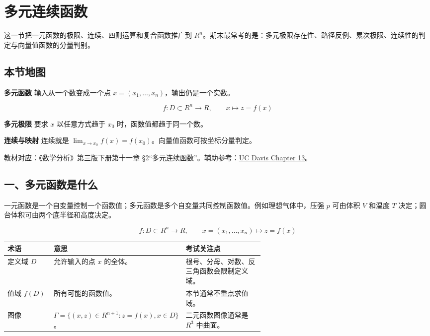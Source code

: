 \section{多元连续函数}

这一节把一元函数的极限、连续、四则运算和复合函数推广到 \(R^n\)。期末最常考的是：多元极限存在性、路径反例、累次极限、连续性的判定与向量值函数的分量判别。

\subsection*{本节地图}

\begin{conceptbox}
\textbf{多元函数}
输入从一个数变成一个点 \(x=(x_1,\ldots,x_n)\)，输出仍是一个实数。

\[
          f:D\subset R^n\to R,\qquad x\mapsto z=f(x)
        \]
\end{conceptbox}

\begin{conceptbox}
\textbf{多元极限}
要求 \(x\) 以任意方式趋于 \(x_0\) 时，函数值都趋于同一个数。
\end{conceptbox}

\begin{conceptbox}
\textbf{连续与映射}
连续就是 \(\lim_{x\to x_0}f(x)=f(x_0)\)。向量值函数可按坐标分量判定。
\end{conceptbox}

教材对应：《数学分析》第三版下册第十一章 §2“多元连续函数”。辅助参考：\href{https://www.math.ucdavis.edu/~hunter/intro_analysis_pdf/ch13.pdf}{UC Davis Chapter 13}。

\subsection*{一、多元函数是什么}

一元函数是一个自变量控制一个函数值；多元函数是多个自变量共同控制函数值。例如理想气体中，压强 \(p\) 可由体积 \(V\) 和温度 \(T\) 决定；圆台体积可由两个底半径和高度决定。

\[
      f:D\subset R^n\to R,\qquad
      x=(x_1,\ldots,x_n)\mapsto z=f(x)
    \]

\begin{center}
\small
\begin{tabularx}{\linewidth}{|>{\raggedright\arraybackslash}p{0.18\linewidth}|>{\raggedright\arraybackslash}p{0.42\linewidth}|>{\raggedright\arraybackslash}X|}
\hline
\textbf{术语} & \textbf{意思} & \textbf{考试关注点} \\ \hline
定义域 \(D\) & 允许输入的点 \(x\) 的全体。 & 根号、分母、对数、反三角函数会限制定义域。 \\ \hline
值域 \(f(D)\) & 所有可能的函数值。 & 本节通常不重点求值域。 \\ \hline
图像 & \(\Gamma=\{(x,z)\in R^{n+1}:z=f(x),x\in D\}\)。 & 二元函数图像通常是 \(R^3\) 中曲面。 \\ \hline
\end{tabularx}
\end{center}

